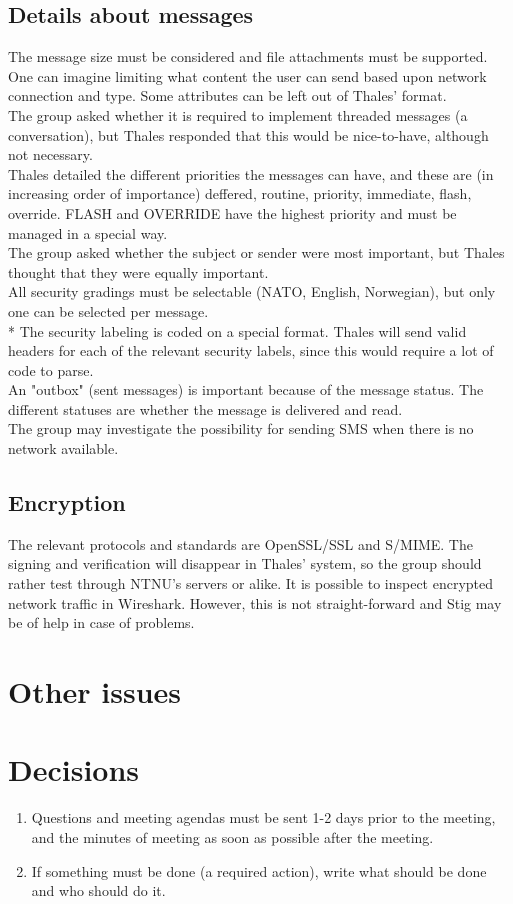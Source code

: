 \documentclass[a4paper,12pt]{article}
\begin{document}
\subsection{Details about messages}
The message size must be considered and file attachments must be supported. One can imagine limiting what content the user can send based upon network connection and type. Some attributes can be left out of Thales' format.\\
The group asked whether it is required to implement threaded messages (a conversation), but Thales responded that this would be nice-to-have, although not necessary.\\
Thales detailed the different priorities the messages can have, and these are (in increasing order of importance) deffered, routine, priority, immediate, flash, override. FLASH and OVERRIDE have the highest priority and must be managed in a special way.\\
The group asked whether the subject or sender were most important, but Thales thought that they were equally important.\\
All security gradings must be selectable (NATO, English, Norwegian), but only one can be selected per message.\\*
The security labeling is coded on a special format. Thales will send valid headers for each of the relevant security labels, since this would require a lot of code to parse.\\
An "outbox" (sent messages) is important because of the message status. The different statuses are whether the message is delivered and read.\\
The group may investigate the possibility for sending SMS when there is no network available.
\subsection{Encryption}
The relevant protocols and standards are OpenSSL/SSL and S/MIME. The signing and verification will disappear in Thales' system, so the group should rather test through NTNU's servers or alike. It is possible to inspect encrypted network traffic in Wireshark. However, this is not straight-forward and Stig may be of help in case of problems.
\section{Other issues}
\section{Decisions}
\begin{enumerate}
\item
Questions and meeting agendas must be sent 1-2 days prior to the meeting, and the minutes of meeting as soon as possible after the meeting.
\item
If something must be done (a required action), write what should be done and who should do it.
\end{enumerate}
\end{document}
